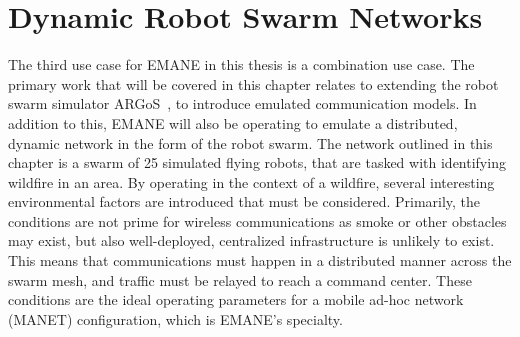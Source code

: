 \chapter{Dynamic Robot Swarm Networks}
\label{chapter5}
The third use case for EMANE in this thesis is a combination use case.
The primary work that will be covered in this chapter relates to extending the robot swarm simulator ARGoS~\cite{argos}, to introduce emulated communication models.
In addition to this, EMANE will also be operating to emulate a distributed, dynamic network in the form of the robot swarm.
The network outlined in this chapter is a swarm of 25 simulated flying robots, that are tasked with identifying wildfire in an area.
By operating in the context of a wildfire, several interesting environmental factors are introduced that must be considered.
Primarily, the conditions are not prime for wireless communications as smoke or other obstacles may exist, but also well-deployed, centralized infrastructure is unlikely to exist.
This means that communications must happen in a distributed manner across the swarm mesh, and traffic must be relayed to reach a command center.
These conditions are the ideal operating parameters for a mobile ad-hoc network (MANET) configuration, which is EMANE's specialty.

